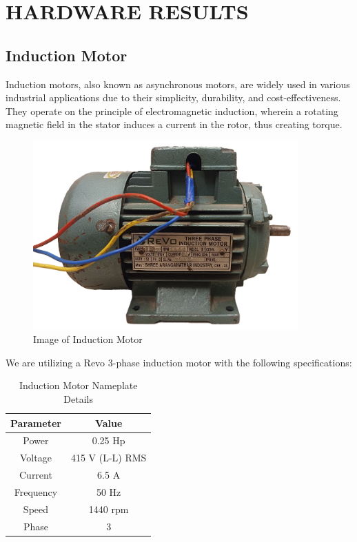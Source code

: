 \section{HARDWARE RESULTS}


\subsection{Induction Motor}

Induction motors, also known as asynchronous motors, are widely used in various industrial applications due to their simplicity, durability, and cost-effectiveness. They operate on the principle of electromagnetic induction, wherein a rotating magnetic field in the stator induces a current in the rotor, thus creating torque.

\begin{figure}[H]
	\centering
	\includegraphics[width=4.0in]{sections/section4/images/inductionMotor/revo.png}
	\caption{Image of Induction Motor}
\end{figure}

We are utilizing a Revo 3-phase induction motor with the following specifications:

\begin{table}[H]
	\centering
	\begin{tabular}{|c|c|}
		\hline
		\textbf{Parameter} & \textbf{Value} \\ \hline
		Power & 0.25 Hp \\ \hline
		Voltage & 415 V (L-L) RMS \\ \hline
		Current & 6.5 A \\ \hline
		Frequency & 50 Hz \\ \hline
		Speed & 1440 rpm \\ \hline
		Phase & 3 \\ \hline
	\end{tabular}
	\caption{Induction Motor Nameplate Details}
\end{table}

